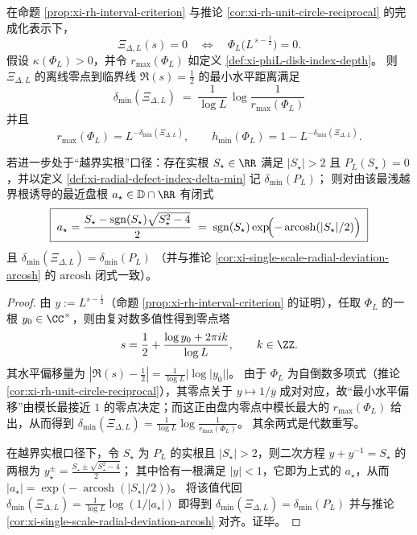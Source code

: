 \begin{proposition}\label{prop:xi-phiL-depth-delta-min-alignment}
在命题 \ref{prop:xi-rh-interval-criterion} 与推论 \ref{cor:xi-rh-unit-circle-reciprocal} 的完成化表示下，
\[
\Xi_{\Delta,L}(s)=0
\quad\Longleftrightarrow\quad
\Phi_L\!\bigl(L^{\,s-\frac12}\bigr)=0.
\]
假设 \(\kappa(\Phi_L)>0\)，并令 \(r_{\max}(\Phi_L)\) 如定义 \ref{def:xi-phiL-disk-index-depth}。
则 \(\Xi_{\Delta,L}\) 的离线零点到临界线 \(\Re(s)=\tfrac12\) 的最小水平距离满足
\[
\boxed{\;
\delta_{\min}(\Xi_{\Delta,L})
\;=\;
\frac{1}{\log L}\,\log\frac{1}{r_{\max}(\Phi_L)}\;}
\]
并且
\[
\boxed{\;
r_{\max}(\Phi_L)=L^{-\delta_{\min}(\Xi_{\Delta,L})},
\qquad
h_{\min}(\Phi_L)=1-L^{-\delta_{\min}(\Xi_{\Delta,L})}.\;}
\]
\par
若进一步处于“越界实根”口径：存在实根 \(S_\star\in\RR\) 满足 \(|S_\star|>2\) 且 \(P_L(S_\star)=0\)，并以定义 \ref{def:xi-radial-defect-index-delta-min} 记
\(
\delta_{\min}(P_L)
\)；
则对由该最浅越界根诱导的最近盘根 \(a_\star\in\mathbb{D}\cap\RR\) 有闭式
\[
\boxed{\;
a_\star=\frac{S_\star-\operatorname{sgn}(S_\star)\sqrt{S_\star^{2}-4}}{2}
\;=\;
\operatorname{sgn}(S_\star)\exp\!\Bigl(-\operatorname{arcosh}(|S_\star|/2)\Bigr)\;}
\]
且
\(
\delta_{\min}(\Xi_{\Delta,L})=\delta_{\min}(P_L)
\)
（并与推论 \ref{cor:xi-single-scale-radial-deviation-arcosh} 的 \(\mathrm{arcosh}\) 闭式一致）。
\end{proposition}

\begin{proof}
由 \(y:=L^{s-\frac12}\)（命题 \ref{prop:xi-rh-interval-criterion} 的证明），任取 \(\Phi_L\) 的一根 \(y_0\in\CC^\times\)，则由复对数多值性得到零点塔
\[
s=\frac12+\frac{\log y_0+2\pi i k}{\log L},\qquad k\in\ZZ.
\]
其水平偏移量为 \(|\Re(s)-\tfrac12|=\frac{1}{\log L}|\log|y_0||\)。
由于 \(\Phi_L\) 为自倒数多项式（推论 \ref{cor:xi-rh-unit-circle-reciprocal}），其零点关于 \(y\mapsto 1/\overline y\) 成对对应，故“最小水平偏移”由模长最接近 \(1\) 的零点决定；而这正由盘内零点中模长最大的 \(r_{\max}(\Phi_L)\) 给出，从而得到
\(\delta_{\min}(\Xi_{\Delta,L})=\frac{1}{\log L}\log\frac{1}{r_{\max}(\Phi_L)}\)。
其余两式是代数重写。
\par
在越界实根口径下，令 \(S_\star\) 为 \(P_L\) 的实根且 \(|S_\star|>2\)，则二次方程 \(y+y^{-1}=S_\star\) 的两根为
\(
y_\star^{\pm}=\frac{S_\star\pm\sqrt{S_\star^2-4}}{2}
\)；
其中恰有一根满足 \(|y|<1\)，它即为上式的 \(a_\star\)，从而 \(|a_\star|=\exp\!\bigl(-\operatorname{arcosh}(|S_\star|/2)\bigr)\)。
将该值代回 \(\delta_{\min}(\Xi_{\Delta,L})=\frac{1}{\log L}\log(1/|a_\star|)\) 即得到 \(\delta_{\min}(\Xi_{\Delta,L})=\delta_{\min}(P_L)\) 并与推论 \ref{cor:xi-single-scale-radial-deviation-arcosh} 对齐。证毕。
\end{proof}

